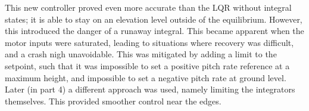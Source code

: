 This new controller proved even more accurate than the LQR without integral states; it is able to stay on an elevation level outside of the equilibrium. However, this introduced the danger of a runaway integral. This became apparent when the motor inputs were saturated, leading to situations where recovery was difficult, and a crash nigh unavoidable. This was mitigated by adding a limit to the setpoint, such that it was impossible to set a positive pitch rate reference at a maximum height, and impossible to set a negative pitch rate at ground level. Later (in part 4) a different approach was used, namely limiting the integrators themselves. This provided smoother control near the edges.